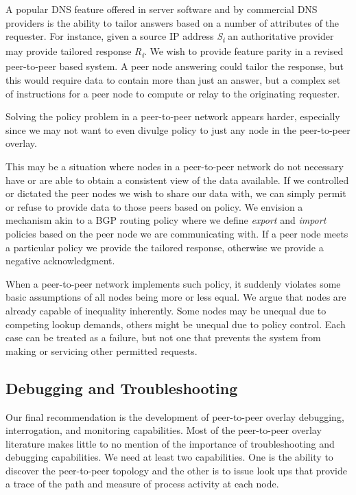 \documentclass[sigconf]{acmart}
\begin{document}
A popular DNS feature offered in server software and by commercial DNS
providers is the ability to tailor answers based on a number of
attributes of the requester.  For instance, given a source IP address
\emph{S\textsubscript{i}} an authoritative provider may provide tailored
response \emph{R\textsubscript{i}}.  We wish to provide feature parity
in a revised peer-to-peer based system.  A peer node answering could
tailor the response, but this would require data to contain more than
just an answer, but a complex set of instructions for a peer node to
compute or relay to the originating requester.

Solving the policy problem in a peer-to-peer network appears harder,
especially since we may not want to even divulge policy to just any node
in the peer-to-peer overlay.

This may be a situation where nodes in a peer-to-peer network do not
necessary have or are able to obtain a consistent view of the data
available.  If we controlled or dictated the peer nodes we wish to share
our data with, we can simply permit or refuse to provide data to those
peers based on policy.  We envision a mechanism akin to a BGP routing
policy where we define \emph{export} and \emph{import} policies based on
the peer node we are communicating with.  If a peer node meets a
particular policy we provide the tailored response, otherwise we provide
a negative acknowledgment.

When a peer-to-peer network implements such policy, it suddenly violates
some basic assumptions of all nodes being more or less equal.  We argue
that nodes are already capable of inequality inherently.  Some nodes may
be unequal due to competing lookup demands, others might be unequal due
to policy control.  Each case can be treated as a failure, but not one
that prevents the system from making or servicing other permitted
requests.

\subsection{Debugging and Troubleshooting}

Our final recommendation is the development of peer-to-peer overlay
debugging, interrogation, and monitoring capabilities.  Most of the
peer-to-peer overlay literature makes little to no mention of the
importance of troubleshooting and debugging capabilities.  We need at
least two capabilities.  One is the ability to discover the peer-to-peer
topology and the other is to issue look ups that provide a trace of the
path and measure of process activity at each node.
\end{document}
